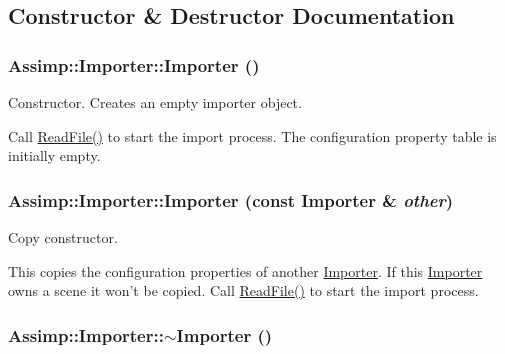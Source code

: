 \subsection{Constructor \& Destructor Documentation}
\hypertarget{class_assimp_1_1_importer_2c207299ed05f1db1ad1e6dab005f719}{
\subsubsection[Importer]{\setlength{\rightskip}{0pt plus 5cm}Assimp::Importer::Importer ()}}
\label{class_assimp_1_1_importer_2c207299ed05f1db1ad1e6dab005f719}


Constructor. Creates an empty importer object.

Call \hyperlink{class_assimp_1_1_importer_174418ab41d5b8bc51a044895cb991e5}{ReadFile()} to start the import process. The configuration property table is initially empty. \hypertarget{class_assimp_1_1_importer_69743664b5a7a8c195be48265144317b}{
\subsubsection[Importer]{\setlength{\rightskip}{0pt plus 5cm}Assimp::Importer::Importer (const {\bf Importer} \& {\em other})}}
\label{class_assimp_1_1_importer_69743664b5a7a8c195be48265144317b}


Copy constructor.

This copies the configuration properties of another \hyperlink{class_assimp_1_1_importer}{Importer}. If this \hyperlink{class_assimp_1_1_importer}{Importer} owns a scene it won't be copied. Call \hyperlink{class_assimp_1_1_importer_174418ab41d5b8bc51a044895cb991e5}{ReadFile()} to start the import process. \hypertarget{class_assimp_1_1_importer_3d65af5286ba22f46220a72a6eb2a1c9}{
\subsubsection[$\sim$Importer]{\setlength{\rightskip}{0pt plus 5cm}Assimp::Importer::$\sim$Importer ()}}
\label{class_assimp_1_1_importer_3d65af5286ba22f46220a72a6eb2a1c9}


